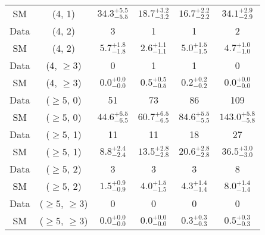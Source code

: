 \begin{table}[h!]
{\begin{tabular}{cccccc}
	SM & (4, 1) & $34.3^{+ 5.5 }_{- 5.5 }$ & $18.7^{+ 3.2 }_{- 3.2 }$ & $16.7^{+ 2.2 }_{- 2.2 }$ & $34.1^{+ 2.9 }_{- 2.9 }$ \\[0.5ex] 
	Data & (4, 2) & 3 & 1 & 1 & 2 \\[0.5ex] 
	SM & (4, 2) & $5.7^{+ 1.8 }_{- 1.8 }$ & $2.6^{+ 1.1 }_{- 1.1 }$ & $5.0^{+ 1.5 }_{- 1.5 }$ & $4.7^{+ 1.0 }_{- 1.0 }$ \\[0.5ex] 
	Data & (4, $\ge3$) & 0 & 1 & 1 & 0 \\[0.5ex] 
	SM & (4, $\ge3$) & $0.0^{+ 0.0 }_{- 0.0 }$ & $0.5^{+ 0.5 }_{- 0.5 }$ & $0.2^{+ 0.2 }_{- 0.2 }$ & $0.0^{+ 0.0 }_{- 0.0 }$ \\[0.5ex] 
	Data & ($\ge5$, 0) & 51 & 73 & 86 & 109 \\[0.5ex] 
	SM & ($\ge5$, 0) & $44.6^{+ 6.5 }_{- 6.5 }$ & $60.7^{+ 6.5 }_{- 6.5 }$ & $84.6^{+ 5.5 }_{- 5.5 }$ & $143.0^{+ 5.8 }_{- 5.8 }$ \\[0.5ex] 
	Data & ($\ge5$, 1) & 11 & 11 & 18 & 27 \\[0.5ex] 
	SM & ($\ge5$, 1) & $8.8^{+ 2.4 }_{- 2.4 }$ & $13.5^{+ 2.8 }_{- 2.8 }$ & $20.6^{+ 2.8 }_{- 2.8 }$ & $36.5^{+ 3.0 }_{- 3.0 }$ \\[0.5ex] 
	Data & ($\ge5$, 2) & 3 & 3 & 3 & 8 \\[0.5ex] 
	SM & ($\ge5$, 2) & $1.5^{+ 0.9 }_{- 0.9 }$ & $4.0^{+ 1.5 }_{- 1.5 }$ & $4.3^{+ 1.4 }_{- 1.4 }$ & $8.0^{+ 1.4 }_{- 1.4 }$ \\[0.5ex] 
	Data & ($\ge5$, $\ge3$) & 0 & 0 & 0 & 0 \\[0.5ex] 
	SM & ($\ge5$, $\ge3$) & $0.0^{+ 0.0 }_{- 0.0 }$ & $0.0^{+ 0.0 }_{- 0.0 }$ & $0.3^{+ 0.3 }_{- 0.3 }$ & $0.5^{+ 0.3 }_{- 0.3 }$ \\[0.5ex] 
	\hline
	\hline
\end{tabular}}
\end{table}
